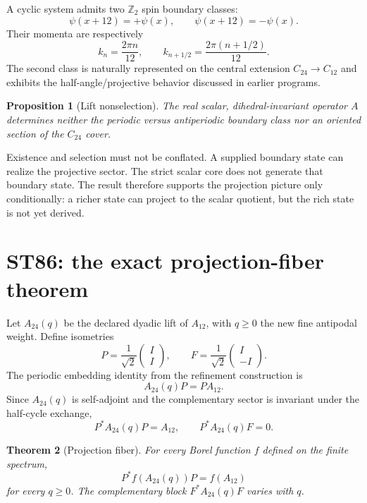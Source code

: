 \documentclass[11pt,a4paper]{article}
\newtheorem{theorem}{Theorem}[section]
\newtheorem{proposition}[theorem]{Proposition}
\begin{document}
A cyclic system admits two $\mathbb Z_2$ spin boundary classes:
\[
\psi(x+12)=+\psi(x),\qquad \psi(x+12)=-\psi(x).
\]
Their momenta are respectively
\[
k_n=\frac{2\pi n}{12},\qquad
k_{n+1/2}=\frac{2\pi(n+1/2)}{12}.
\]
The second class is naturally represented on the central extension $C_{24}\to C_{12}$ and exhibits the half-angle/projective behavior discussed in earlier programs.

\begin{proposition}[Lift nonselection]
The real scalar, dihedral-invariant operator $A$ determines neither the periodic versus antiperiodic boundary class nor an oriented section of the $C_{24}$ cover.
\end{proposition}

Existence and selection must not be conflated. A supplied boundary state can realize the projective sector. The strict scalar core does not generate that boundary state. The result therefore supports the projection picture only conditionally: a richer state can project to the scalar quotient, but the rich state is not yet derived.

\section{ST86: the exact projection-fiber theorem}

Let $A_{24}(q)$ be the declared dyadic lift of $A_{12}$, with $q\ge0$ the new fine antipodal weight. Define isometries
\[
P=\frac1{\sqrt2}\begin{pmatrix}I\\I\end{pmatrix},\qquad
F=\frac1{\sqrt2}\begin{pmatrix}I\\-I\end{pmatrix}.
\]
The periodic embedding identity from the refinement construction is
\[
A_{24}(q)P=PA_{12}.
\]
Since $A_{24}(q)$ is self-adjoint and the complementary sector is invariant under the half-cycle exchange,
\begin{equation}
P^*A_{24}(q)P=A_{12},\qquad P^*A_{24}(q)F=0.
\label{eq:block}
\end{equation}

\begin{theorem}[Projection fiber]
For every Borel function $f$ defined on the finite spectrum,
\begin{equation}
P^*f(A_{24}(q))P=f(A_{12})
\label{eq:functional}
\end{equation}
for every $q\ge0$. The complementary block $F^*A_{24}(q)F$ varies with $q$.
\end{theorem}
\end{document}
